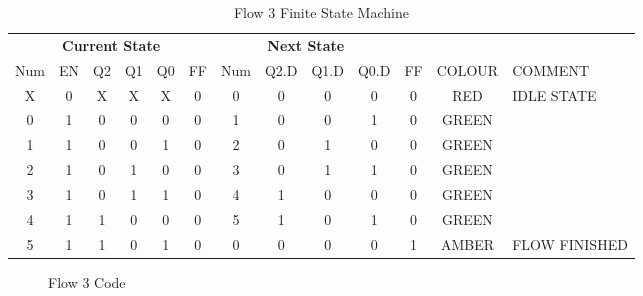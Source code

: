 \begin{table*}[!Htb]
\begin{tabularx}{\linewidth}{ c c c c c c | c c c c c | c X}
  \multicolumn{6}{c|}{\textbf{Current State}} & \multicolumn{4}{c}{\textbf{Next State}} & & \\
  Num & EN & Q2 & Q1 & Q0 & FF & Num & Q2.D & Q1.D & Q0.D & FF & COLOUR & COMMENT \\
  \hline 
    X &  0 &  X &  X &  X &  0 &   0 &    0 &    0 &    0 &  0 & RED   & IDLE STATE \\
    0 &  1 &  0 &  0 &  0 &  0 &   1 &    0 &    0 &    1 &  0 & GREEN & \\
    1 &  1 &  0 &  0 &  1 &  0 &   2 &    0 &    1 &    0 &  0 & GREEN & \\
    2 &  1 &  0 &  1 &  0 &  0 &   3 &    0 &    1 &    1 &  0 & GREEN & \\
    3 &  1 &  0 &  1 &  1 &  0 &   4 &    1 &    0 &    0 &  0 & GREEN & \\
    4 &  1 &  1 &  0 &  0 &  0 &   5 &    1 &    0 &    1 &  0 & GREEN & \\
    5 &  1 &  1 &  0 &  1 &  0 &   0 &    0 &    0 &    0 &  1 & AMBER  & FLOW FINISHED\\
  \end{tabularx}
\caption{Flow 3 Finite State Machine}
\label{tab:F3sm}
\end{table*}

\begin{figure*}

\caption{Flow 3 Code}
\label{lst:F3}
\end{figure*}